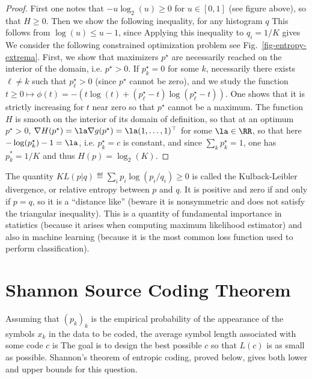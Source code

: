 \begin{proof}
	First one notes that $-u\log_2(u) \geq 0$ for $u \in [0,1]$ (see figure above), so that $H \geq 0$.
	Then we show the following inequality, for any histogram $q$ 
	This follows from $\log(u) \leq u-1$, since
	Applying this inequality to $q_i=1/K$ gives
	We consider the following constrained optimization problem
	see Fig.~\ref{fig-entropy-extrema}.
	First, we show that maximizers $p^\star$ are necessarily reached on the interior of the domain, i.e. $p^\star>0$.
	If $p_k^\star=0$ for some $k$, necessarily there exists $\ell \neq k$ such that $p_\ell^\star>0$ (since $p^\star$ cannot be zero), and we study the function 
	$t \geq 0 \mapsto \phi(t) = - ( t \log(t) + (p_\ell^\star-t) \log(p_\ell^\star-t) )$. One shows that it is strictly increasing for $t$ near zero so that $p^\star$ cannot be a maximum.	
	The function $H$ is smooth on the interior of its domain of definition, so that 
	at an optimum $p^\star>0$, $\nabla H(p^\star)=\la \nabla g(p^\star) = \la (1,\ldots,1)^\top$ for some $\la \in \RR$, so that here $-\log(p_k^\star)-1 = \la$, i.e. $p_k^\star=c$ is constant, and since  $\sum_k p_k^\star=1$, one has $p_k^*=1/K$ and thus $H(p)=\log_2(K)$.
	\fi
\end{proof}

The quantity $KL(p|q) \eqdef \sum_i p_i \log(p_i/q_i) \geq 0$ is called the Kulback-Leibler divergence, or relative entropy between $p$ and $q$. It is positive and zero if and only if $p=q$, so it is a ``distance like'' (beware it is nonsymmetric and does not satisfy the triangular inequality). This is a quantity of fundamental importance in statistics (because it arises when computing maximum likelihood estimator) and also in machine learning (because it is the most common loss function used to perform classification).


\section{Shannon Source Coding Theorem}

Assuming that $(p_k)_k$ is the empirical probability of the appearance of the symbols $x_k$ in the data to be coded, the average symbol length associated with some code $c$ is 
The goal is to design the best possible $c$ so that $L(c)$ is as small as possible.
%
Shannon's theorem of entropic coding, proved below, gives both lower and upper bounds for this question. 

